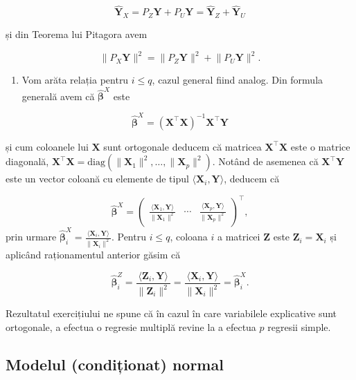 \documentclass[]{article}
\providecommand{\tightlist}{%
  \setlength{\itemsep}{0pt}\setlength{\parskip}{0pt}}
\begin{document}
\[
  \hat{\boldsymbol Y}_X = P_Z\boldsymbol Y + P_U\boldsymbol Y = \hat{\boldsymbol Y}_Z + \hat{\boldsymbol Y}_U
\]

și din Teorema lui Pitagora avem

\[
  \lVert P_X\boldsymbol Y\rVert^2 = \lVert P_Z\boldsymbol Y\rVert^2 + \lVert P_U\boldsymbol Y\rVert^2. 
\]

\begin{enumerate}
\def\labelenumi{\arabic{enumi}.}
\setcounter{enumi}{1}
\tightlist
\item
  Vom arăta relația pentru \(i\leq q\), cazul general fiind analog. Din
  formula generală avem că \(\hat{\boldsymbol\beta}^X\) este
\end{enumerate}

\[
  \hat{\boldsymbol\beta}^X = \left(\boldsymbol X^\intercal \boldsymbol X\right)^{-1}\boldsymbol X^\intercal\boldsymbol Y
\]

și cum coloanele lui \(\boldsymbol X\) sunt ortogonale deducem că
matricea \(\boldsymbol X^\intercal\boldsymbol X\) este o matrice
diagonală,
\(\boldsymbol X^\intercal\boldsymbol X = \mathrm{diag}\left(\lVert\boldsymbol X_1\rVert^2, \ldots, \lVert\boldsymbol X_p\rVert^2\right)\).
Notând de asemenea că \(\boldsymbol X^\intercal\boldsymbol Y\) este un
vector coloană cu elemente de tipul
\(\langle\boldsymbol X_i, \boldsymbol Y\rangle\), deducem că

\[
  \hat{\boldsymbol\beta}^X = \begin{pmatrix}\frac{\langle\boldsymbol X_1, \boldsymbol Y\rangle}{\lVert\boldsymbol X_1\rVert^2} & \cdots & \frac{\langle\boldsymbol X_p, \boldsymbol Y\rangle}{\lVert\boldsymbol X_p\rVert^2}\end{pmatrix}^\intercal,
\] prin urmare
\(\hat{\boldsymbol\beta}_i^X = \frac{\langle\boldsymbol X_i, \boldsymbol Y\rangle}{\lVert\boldsymbol X_i\rVert^2}\).
Pentru \(i\leq q\), coloana \(i\) a matricei \(\boldsymbol Z\) este
\(\boldsymbol Z_i = \boldsymbol X_i\) și aplicând raționamentul anterior
găsim că

\[
\hat{\boldsymbol\beta}_i^Z = \frac{\langle\boldsymbol Z_i, \boldsymbol Y\rangle}{\lVert\boldsymbol Z_i\rVert^2} = \frac{\langle\boldsymbol X_i, \boldsymbol Y\rangle}{\lVert\boldsymbol X_i\rVert^2} = \hat{\boldsymbol\beta}_i^X.
\]

Rezultatul exercițiului ne spune că în cazul în care variabilele
explicative sunt ortogonale, a efectua o regresie multiplă revine la a
efectua \(p\) regresii simple.

\subsection{Modelul (condiționat)
normal}\label{modelul-conditionat-normal}
\end{document}
